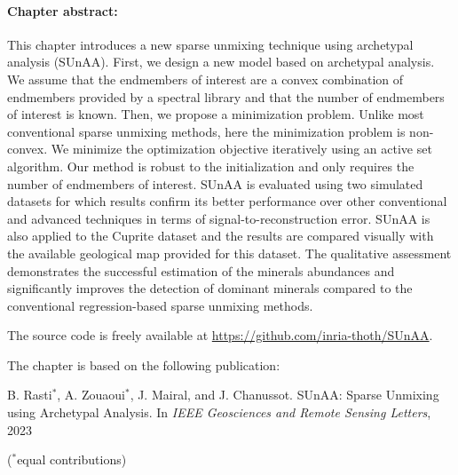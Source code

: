 \begin{tcolorbox}[colback=gray!5!white,colframe=gray!75!black]

        \paragraph{Chapter abstract:}
        This chapter introduces a new sparse unmixing technique using archetypal analysis (SUnAA).
        First, we design a new model based on archetypal analysis. 
        We assume that the endmembers of interest are a convex combination of endmembers provided by a spectral library and that the number of endmembers of interest is known. 
        Then, we propose a minimization problem. 
        Unlike most conventional sparse unmixing methods, here the minimization problem is non-convex. 
        We minimize the optimization objective iteratively using an active set algorithm.
        Our method is robust to the initialization and only requires the number of endmembers of interest. 
        SUnAA is evaluated using two simulated datasets for which results confirm its better
        performance over other conventional and advanced techniques in terms of signal-to-reconstruction error. 
        SUnAA is also applied to the Cuprite dataset and the results are compared visually with the available geological map provided for this dataset. 
        The qualitative assessment demonstrates the successful estimation of the minerals abundances and significantly improves the detection of dominant minerals compared to the conventional regression-based sparse unmixing methods. 

        \vspace{1em}
        The source code is freely available at \href{https://github.com/inria-thoth/SUnAA}{https://github.com/inria-thoth/SUnAA}.
        
        \vspace{1em}
        The chapter is based on the following publication:

        \vspace{0.5em}

        B. Rasti$^{*}$, A. Zouaoui$^{*}$, J. Mairal, and J. Chanussot. SUnAA: Sparse Unmixing using Archetypal Analysis. In \emph{IEEE Geosciences and Remote Sensing Letters}, 2023

        \vspace{0.5em}

        ($^{*}$equal contributions)
    \end{tcolorbox}

